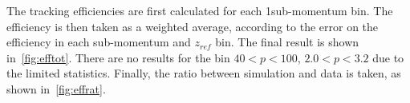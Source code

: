 
  
    

The tracking efficiencies are first calculated for each 1\gevc sub-momentum bin. The efficiency is then taken as a weighted average, according to the error on the efficiency in each sub-momentum and $z_{ref}$ bin. The final result is shown in~\autoref{fig:efftot}. There are no results for the bin $40<p<100$\gevc, $2.0<p<3.2$ due to the limited statistics. Finally, the ratio between simulation and data is taken, as shown in~\autoref{fig:effrat}.


